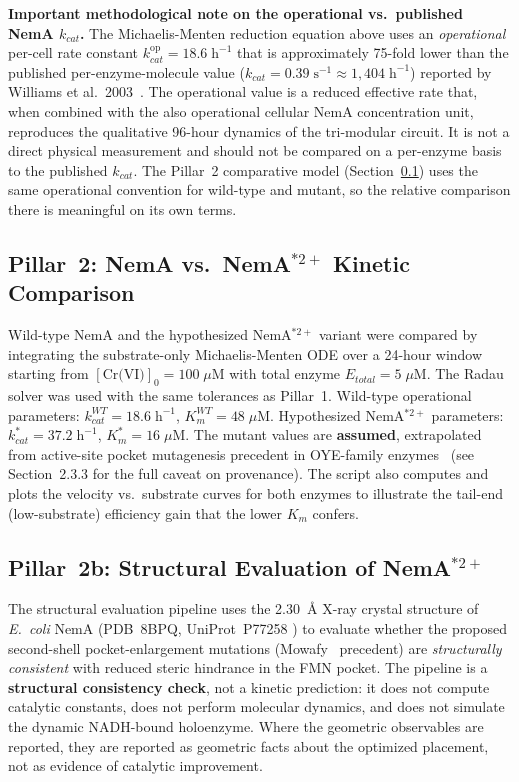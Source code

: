 \documentclass[10pt,twocolumn,letterpaper,
              colorlinks=true,
              linkcolor=blue!70!black,
              citecolor=blue!70!black,
              urlcolor=blue!70!black,
              pdfborder={0 0 0}]{article}
\begin{document}
\medskip
\textbf{Important methodological note on the operational vs.\ published
NemA $k_{cat}$.} The Michaelis-Menten reduction equation above uses an
\textit{operational} per-cell rate constant
$k_{cat}^{\text{op}} = 18.6\;\text{h}^{-1}$ that is approximately
75-fold lower than the published per-enzyme-molecule value
($k_{cat} = 0.39\;\text{s}^{-1} \approx 1{,}404\;\text{h}^{-1}$)
reported by Williams et al.\ 2003~\cite{williams2003}. The operational
value is a reduced effective rate that, when combined with the also
operational cellular NemA concentration unit, reproduces the qualitative
96-hour dynamics of the tri-modular circuit. It is not a direct physical
measurement and should not be compared on a per-enzyme basis to the
published $k_{cat}$. The Pillar~2 comparative model
(Section~\ref{sec:pillar2}) uses the same operational convention for
wild-type and mutant, so the relative comparison there is meaningful on
its own terms.

\subsection{Pillar~2: NemA vs.\ NemA$^{*2+}$ Kinetic Comparison}
\label{sec:pillar2}

Wild-type NemA and the hypothesized NemA$^{*2+}$ variant were compared
by integrating the substrate-only Michaelis-Menten ODE over a 24-hour
window starting from $[\text{Cr(VI)}]_0 = 100\;\mu$M with total enzyme
$E_{total} = 5\;\mu$M. The Radau solver was used with the same tolerances
as Pillar~1. Wild-type operational parameters: $k_{cat}^{WT} = 18.6\;\text{h}^{-1}$,
$K_m^{WT} = 48\;\mu$M. Hypothesized NemA$^{*2+}$ parameters:
$k_{cat}^{*} = 37.2\;\text{h}^{-1}$, $K_m^{*} = 16\;\mu$M. The mutant
values are \textbf{assumed}, extrapolated from active-site pocket
mutagenesis precedent in OYE-family enzymes~\cite{mowafy2010} (see
Section~2.3.3 for the full caveat on provenance). The script also
computes and plots the velocity vs.\ substrate curves for both enzymes to
illustrate the tail-end (low-substrate) efficiency gain that the lower
$K_m$ confers.

\subsection{Pillar~2b: Structural Evaluation of NemA$^{*2+}$}
\label{sec:pillar2b}

The structural evaluation pipeline uses the 2.30~\AA{} X-ray crystal
structure of \textit{E.~coli} NemA (PDB~8BPQ, UniProt~P77258
\cite{uniprotP77258}) to evaluate whether the proposed second-shell
pocket-enlargement mutations (Mowafy~\cite{mowafy2010} precedent) are
\textit{structurally consistent} with reduced steric hindrance in the
FMN pocket. The pipeline is a \textbf{structural consistency check}, not
a kinetic prediction: it does not compute catalytic constants, does not
perform molecular dynamics, and does not simulate the dynamic NADH-bound
holoenzyme. Where the geometric observables are reported, they are
reported as geometric facts about the optimized placement, not as
evidence of catalytic improvement.
\end{document}
